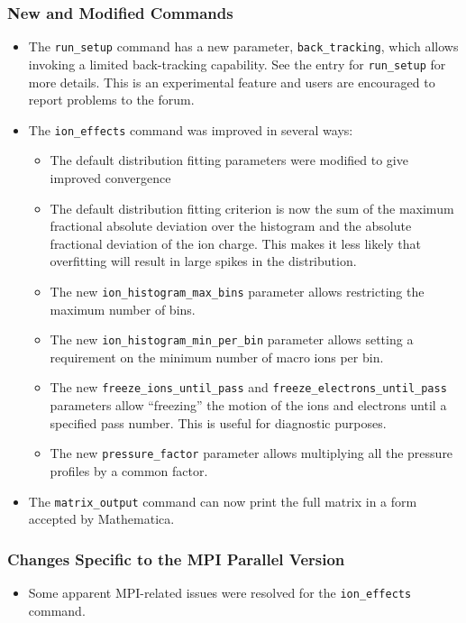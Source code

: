 \documentclass[11pt]{article}
\begin{document}
\subsubsection{New and Modified Commands}
\begin{itemize}
\item The \verb|run_setup| command has a new parameter, \verb|back_tracking|, which allows invoking a limited
  back-tracking capability. See the entry for \verb|run_setup| for more details.
  This is an experimental feature and users are encouraged to report problems to the forum.
\item The \verb|ion_effects| command was improved in several ways: 
  \begin{itemize}
  \item The default distribution fitting parameters were modified to give improved convergence
  \item The default distribution fitting criterion is now the sum of the maximum fractional absolute deviation over the histogram
    and the absolute fractional deviation of the ion charge. This makes it less likely that overfitting will result 
    in large spikes in the distribution.
  \item The new \verb|ion_histogram_max_bins| parameter allows restricting the maximum number of bins.
  \item The new \verb|ion_histogram_min_per_bin| parameter allows setting a requirement on the minimum number of 
    macro ions per bin.
  \item The new \verb|freeze_ions_until_pass| and \verb|freeze_electrons_until_pass| parameters allow ``freezing'' the motion of the
    ions and electrons until a specified pass number. This is useful for diagnostic purposes.
  \item The new \verb|pressure_factor| parameter allows multiplying all the pressure profiles by a common factor.
  \end{itemize}
\item The \verb|matrix_output| command can now print the full matrix in a form accepted by Mathematica.
\end{itemize}

\subsubsection{Changes Specific to the MPI Parallel Version}

\begin{itemize}
\item Some apparent MPI-related issues were resolved for the \verb|ion_effects| command.
\end{itemize}
\end{document}
